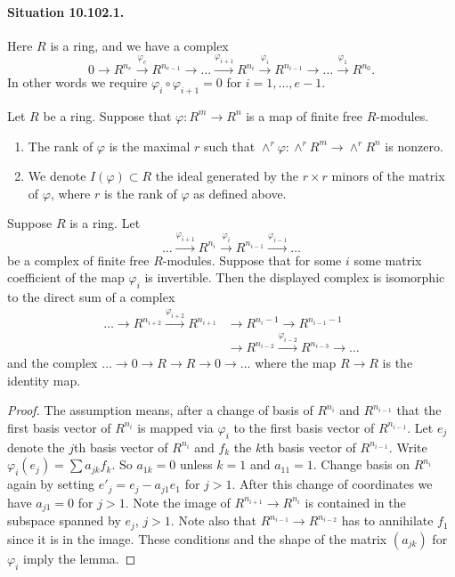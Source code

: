\paragraph{Situation 10.102.1.}
Here $R$ is a ring, and we have a complex
\[
0\to R^{n_e}\xrightarrow{\varphi_e}R^{n_{e-1}}\to\ldots
\xrightarrow{\varphi_{i+1}}R^{n_i}\xrightarrow{\varphi_i}R^{n_{i-1}}
\to\ldots\xrightarrow{\varphi_1}R^{n_0}.
\]
In other words we require $\varphi_i\circ\varphi_{i+1}=0$ for $i=1,\ldots,e-1$.

\begin{definition}[10.102.5, Tag 00MV]
Let $R$ be a ring. Suppose that $\varphi:R^m\to R^n$ is a map of finite free $R$-modules.
\begin{enumerate}
\item The rank of $\varphi$ is the maximal $r$ such that $\wedge^r\varphi:\wedge^rR^m\to\wedge^rR^n$ is nonzero.
\item We denote $I(\varphi)\subset R$ the ideal generated by the $r\times r$ minors of the matrix of $\varphi$, where $r$ is the rank of $\varphi$ as defined above.
\end{enumerate}
\end{definition}

\begin{lemma}[10.102.2, Tag 00MT]
Suppose $R$ is a ring. Let
\[
\ldots\xrightarrow{\varphi_{i+1}}R^{n_i}\xrightarrow{\varphi_i}R^{n_{i-1}}
\xrightarrow{\varphi_{i-1}}\ldots
\]
be a complex of finite free $R$-modules. Suppose that for some $i$ some matrix coefficient of the map $\varphi_i$ is invertible. Then the displayed complex is isomorphic to the direct sum of a complex
\[
\begin{aligned}
\ldots\to R^{n_{i+2}}\xrightarrow{\varphi_{i+2}}R^{n_{i+1}}
&\to R^{n_i-1}\to R^{n_{i-1}-1}\\
&\to R^{n_{i-2}}\xrightarrow{\varphi_{i-2}}R^{n_{i-3}}\to\ldots
\end{aligned}
\]
and the complex $\ldots\to0\to R\to R\to0\to\ldots$ where the map $R\to R$ is the identity map.
\end{lemma}
\begin{proof}
The assumption means, after a change of basis of $R^{n_i}$ and $R^{n_{i-1}}$ that the first basis vector of $R^{n_i}$ is mapped via $\varphi_i$ to the first basis vector of $R^{n_{i-1}}$. Let $e_j$ denote the $j$th basis vector of $R^{n_i}$ and $f_k$ the $k$th basis vector of $R^{n_{i-1}}$. Write $\varphi_i(e_j)=\sum a_{jk}f_k$. So $a_{1k}=0$ unless $k=1$ and $a_{11}=1$. Change basis on $R^{n_i}$ again by setting $e'_j=e_j-a_{j1}e_1$ for $j>1$. After this change of coordinates we have $a_{j1}=0$ for $j>1$. Note the image of $R^{n_{i+1}}\to R^{n_i}$ is contained in the subspace spanned by $e_j$, $j>1$. Note also that $R^{n_{i-1}}\to R^{n_{i-2}}$ has to annihilate $f_1$ since it is in the image. These conditions and the shape of the matrix $(a_{jk})$ for $\varphi_i$ imply the lemma.
\end{proof}

